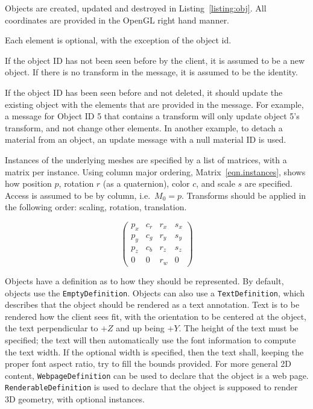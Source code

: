 \documentclass[11pt, oneside]{amsart}
\begin{document}
Objects are created, updated and destroyed in Listing~\ref{listing:obj}. All coordinates are provided in the OpenGL right hand manner.



Each element is optional, with the exception of the object id.

If the object ID has not been seen before by the client, it is assumed to be a new object. If there is no transform in the message, it is assumed to be the identity.

If the object ID has been seen before and not deleted, it should update the existing object with the elements that are provided in the message. For example, a message for Object ID 5 that contains a transform will only update object 5's transform, and not change other elements. In another example, to detach a material from an object, an update message with a null material ID is used.

Instances of the underlying meshes are specified by a list of matrices, with a matrix per instance. Using column major ordering, Matrix~\ref{eqn.instances}, shows how position $p$, rotation $r$ (as a quaternion), color $c$, and scale $s$ are specified. Access is assumed to be by column, i.e.\ $M_0 = p$. Transforms should be applied in the following order: scaling, rotation, translation.

\begin{equation}
\label{eqn.instances}
\left(
\begin{array}{cccc}
p_x & c_r & r_x & s_x \\
p_y & c_g & r_y & s_y \\
p_z & c_b & r_z & s_z \\
0 & 0 & r_w & 0
\end{array}
\right)
\end{equation}

Objects have a definition as to how they should be represented. By default, objects use the \texttt{EmptyDefinition}. Objects can also use a \texttt{TextDefinition}, which describes that the object should be rendered as a text annotation. Text is to be rendered how the client sees fit, with the orientation to be centered at the object, the text perpendicular to $+Z$ and up being $+Y$. The height of the text must be specified; the text will then automatically use the font information to compute the text width. If the optional width is specified, then the text shall, keeping the proper font aspect ratio, try to fill the bounds provided.
For more general 2D content, \texttt{WebpageDefinition} can be used to declare that the object is a web page. \texttt{RenderableDefinition} is used to declare that the object is supposed to render 3D geometry, with optional instances.
\end{document}
